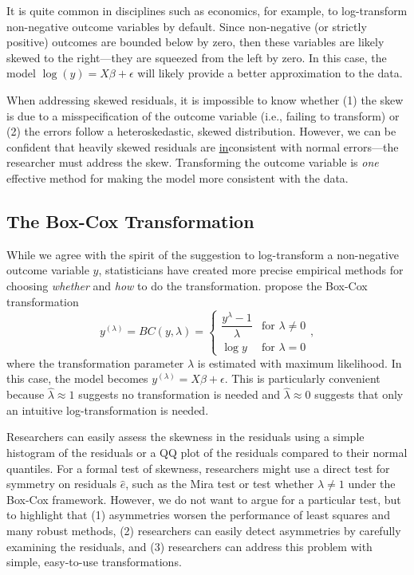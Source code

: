 \documentclass[12pt]{article}
\begin{document}
It is quite common in disciplines such as economics, for example, to log-transform non-negative outcome variables by default. 
Since non-negative (or strictly positive) outcomes are bounded below by zero, then these variables are likely skewed to the right---they are squeezed from the left by zero. 
In this case, the model $\log(y) = X\beta + \epsilon$ will likely provide a better approximation to the data.

When addressing skewed residuals, it is impossible to know whether (1) the skew is due to a misspecification of the outcome variable (i.e., failing to transform) or (2) the errors follow a heteroskedastic, skewed distribution. 
However, we can be confident that heavily skewed residuals are \underline{in}consistent with normal errors---the researcher must address the skew.
Transforming the outcome variable is \textit{one} effective method for making the model more consistent with the data.

\subsection*{The Box-Cox Transformation}

While we agree with the spirit of the suggestion to log-transform a non-negative outcome variable $y$, statisticians have created more precise empirical methods for choosing \textit{whether} and \textit{how} to do the transformation. 
\cite{BoxCox1964} propose the Box-Cox transformation 
\begin{displaymath}
   y^{(\lambda)} = BC(y, \lambda) = \left\{
     \begin{array}{lr}
       \dfrac{y^\lambda - 1}{\lambda} & \text{for } \lambda \neq 0\\
       \log y & \text{for } \lambda = 0
     \end{array}
   \right.,
\end{displaymath}
\noindent where the transformation parameter $\lambda$ is estimated with maximum likelihood. 
In this case, the model becomes $y^{(\lambda)} = X\beta + \epsilon$. 
This is particularly convenient because $\hat{\lambda} \approx 1$ suggests no transformation is needed and $\hat{\lambda} \approx 0$ suggests that only an intuitive log-transformation is needed.

Researchers can easily assess the skewness in the residuals using a simple histogram of the residuals or a QQ plot of the residuals compared to their normal quantiles. 
For a formal test of skewness, researchers might use a direct test for symmetry on residuals $\hat{e}$, such as the Mira test \citep{Mira1999} or test whether $\lambda \neq 1$ under the Box-Cox framework. 
However, we do not want to argue for a particular test, but to highlight that (1) asymmetries worsen the performance of least squares and many robust methods, (2) researchers can easily detect asymmetries by carefully examining the residuals, and (3) researchers can address this problem with simple, easy-to-use transformations.
\end{document}
